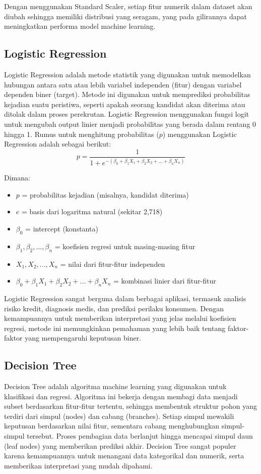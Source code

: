 Dengan menggunakan Standard Scaler, setiap fitur numerik dalam dataset akan diubah sehingga memiliki distribusi yang seragam, yang pada gilirannya dapat meningkatkan performa model machine learning.

\subsection{Logistic Regression}
Logistic Regression adalah metode statistik yang digunakan untuk memodelkan hubungan antara satu atau lebih variabel independen (fitur) dengan variabel dependen biner (target). Metode ini digunakan untuk memprediksi probabilitas kejadian suatu peristiwa, seperti apakah seorang kandidat akan diterima atau ditolak dalam proses perekrutan. Logistic Regression menggunakan fungsi logit untuk mengubah output linier menjadi probabilitas yang berada dalam rentang 0 hingga 1. \parencite{hosmer2013applied}
Rumus untuk menghitung probabilitas ($p$) menggunakan Logistic Regression adalah sebagai berikut:
\begin{equation}
    p = \frac{1}{1 + e^{-(\beta_0 + \beta_1X_1 + \beta_2X_2 + ... + \beta_nX_n)}}
\end{equation}

Dimana:
\begin{itemize}
    \item $p$ = probabilitas kejadian (misalnya, kandidat diterima)
    \item $e$ = basis dari logaritma natural (sekitar 2,718)
    \item $\beta_0$ = intercept (konstanta)
    \item $\beta_1, \beta_2, ..., \beta_n$ = koefisien regresi untuk masing-masing fitur
    \item $X_1, X_2, ..., X_n$ = nilai dari fitur-fitur independen
    \item $\beta_0 + \beta_1X_1 + \beta_2X_2 + ... + \beta_nX_n$ = kombinasi linier dari fitur-fitur
\end{itemize}

Logistic Regression sangat berguna dalam berbagai aplikasi, termasuk analisis risiko kredit, diagnosis medis, dan prediksi perilaku konsumen. Dengan kemampuannya untuk memberikan interpretasi yang jelas melalui koefisien regresi, metode ini memungkinkan pemahaman yang lebih baik tentang faktor-faktor yang mempengaruhi keputusan biner.

\subsection{Decision Tree}
Decision Tree adalah algoritma machine learning yang digunakan untuk klasifikasi dan regresi. Algoritma ini bekerja dengan membagi data menjadi subset berdasarkan fitur-fitur tertentu, sehingga membentuk struktur pohon yang terdiri dari simpul (nodes) dan cabang (branches). Setiap simpul mewakili keputusan berdasarkan nilai fitur, sementara cabang menghubungkan simpul-simpul tersebut. Proses pembagian data berlanjut hingga mencapai simpul daun (leaf nodes) yang memberikan prediksi akhir. Decision Tree sangat populer karena kemampuannya untuk menangani data kategorikal dan numerik, serta memberikan interpretasi yang mudah dipahami.

